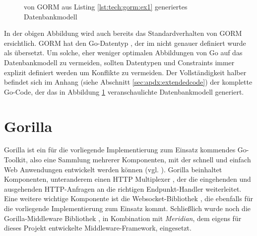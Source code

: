 \begin{figure}[h!]
    \centering
    \caption{von GORM aus Listing \ref{lst:tech:gorm:ex1} generiertes Datenbankmodell}
    \label{img:tech:gorm:schema:ex1}
\end{figure}

\newpage
\noindent
In der obigen Abbildung wird auch bereits das Standardverhalten von GORM ersichtlich. GORM hat den Go-Datentyp , der im  nicht genauer definiert wurde als  übersetzt. Um solche, eher weniger optimalen Abbildungen von Go auf das Datenbankmodell zu vermeiden, sollten Datentypen und Constraints immer explizit definiert werden um Konflikte zu vermeiden. 
Der Vollständigkeit halber befindet sich im Anhang (siehe Abschnitt \ref{sec:apdx:extendedcode}) der komplette Go-Code, der das in Abbildung \ref{img:tech:gorm:schema:ex1} veranschaulichte Datenbankmodell generiert.

\section{Gorilla}\label{sec:tech:gorilla}
Gorilla ist ein für die vorliegende Implementierung zum Einsatz kommendes Go-Toolkit, also eine Sammlung mehrerer Komponenten, mit der schnell und einfach Web Anwendungen entwickelt werden können (vgl. \cite{go:gorilla}). Gorilla beinhaltet Komponenten, unteranderem einen HTTP Multiplexer , der die eingehenden und ausgehenden HTTP-Anfragen an die richtigen Endpunkt-Handler weiterleitet. Eine weitere wichtige Komponente ist die Websocket-Bibliothek , die ebenfalls für die vorliegende Implementierung zum Einsatz kommt. Schließlich wurde noch die Gorilla-Middleware Bibliothek , in Kombination mit \textit{Meridian}, dem eigens für dieses Projekt entwickelte Middleware-Framework, eingesetzt.    


